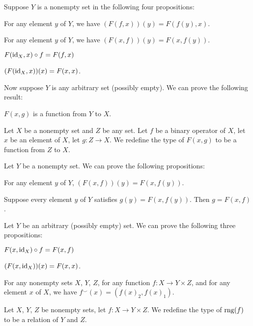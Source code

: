 \documentclass{article}
\begin{document}
Suppose $Y$ is a nonempty set in the following four propositions:
\begin{thm}
\item\label{funcop1:48} For any element $y$ of $Y$, we have
  $(F(f,x))(y)=F(f(y),x)$.
\item\label{funcop1:49} For any element $y$ of $Y$, we have
  $(F(x,f))(y)=F(x,f(y))$.
\item\label{funcop1:50} $F(\operatorname{id}_{X},x)\circ f=F(f,x)$
\item\label{funcop1:51} $(F(\operatorname{id}_{X},x))(x)=F(x,x)$.
\end{thm}

Now suppose $Y$ is any arbitrary set (possibly empty). We can prove the
following result:
\begin{thm}
\item\label{funcop1:52} $F(x,g)$ is a function from $Y$ to $X$.
\end{thm}

\begin{definition}
Let $X$ be a nonempty set and $Z$ be any set.
Let $f$ be a binary operator of $X$, let $x$ be an element of $X$,
let $g\colon Z\to X$.
We redefine the type of $F(x,g)$ to be a function from $Z$ to $X$.
\end{definition}

Let $Y$ be a nonempty set. We can prove the following propositions:
\begin{thm}
\item\label{funcop1:53} For any element $y$ of $Y$, $(F(x,f))(y)=F(x,f(y))$.
\item\label{funcop1:54} Suppose every element $y$ of $Y$ satisfies $g(y)=F(x,f(y))$.
  Then $g=F(x,f)$.
\end{thm}

Let $Y$ be an arbitrary (possibly empty) set. We can prove the following
three propositions:
\begin{thm}
\item\label{funcop1:55} $F(x,\operatorname{id}_{X})\circ f=F(x,f)$
\item\label{funcop1:56} $(F(x,\operatorname{id}_{X}))(x)=F(x,x)$.
\item\label{funcop1:57} For any nonempty sets $X$, $Y$, $Z$, for any
  function $f\colon X\to Y\times Z$, and for any element $x$ of $X$,
  we have $f^{\smile}(x)=(f(x)_{2},f(x)_{1})$.
\end{thm}

\begin{definition}
Let $X$, $Y$, $Z$ be nonempty sets, let $f\colon X\to Y\times Z$.
We redefine the type of $\operatorname{rng}(f)$ to be a relation of $Y$ and $Z$.
\end{definition}
\end{document}
